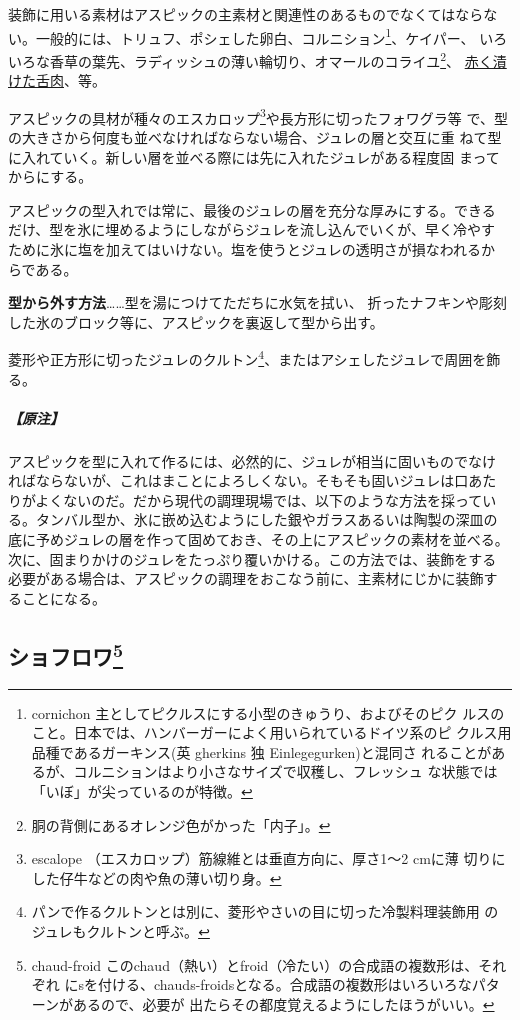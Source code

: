 装飾に用いる素材はアスピックの主素材と関連性のあるものでなくてはならな
い。一般的には、トリュフ、ポシェした卵白、コルニション\footnote{cornichon
  主としてピクルスにする小型のきゅうり、およびそのピク
  ルスのこと。日本では、ハンバーガーによく用いられているドイツ系のピ
  クルス用品種であるガーキンス(英 gherkins 独 Einlegegurken)と混同さ
  れることがあるが、コルニションはより小さなサイズで収穫し、フレッシュ
  な状態では「いぼ」が尖っているのが特徴。}、ケイパー、
いろいろな香草の葉先、ラディッシュの薄い輪切り、オマールのコライユ\footnote{胴の背側にあるオレンジ色がかった「内子」。}、
\protect\hyperlink{saumure-liquide-pour-langues}{赤く漬けた舌肉}、等。

アスピックの具材が種々のエスカロップ\footnote{escalope
  （エスカロップ）筋線維とは垂直方向に、厚さ1〜2 cmに薄
  切りにした仔牛などの肉や魚の薄い切り身。}や長方形に切ったフォワグラ等
で、型の大きさから何度も並べなければならない場合、ジュレの層と交互に重
ねて型に入れていく。新しい層を並べる際には先に入れたジュレがある程度固
まってからにする。

アスピックの型入れでは常に、最後のジュレの層を充分な厚みにする。できる
だけ、型を氷に埋めるようにしながらジュレを流し込んでいくが、早く冷やす
ために氷に塩を加えてはいけない。塩を使うとジュレの透明さが損なわれるか
らである。

\noindent\textbf{型から外す方法}\ldots{}\ldots{}型を湯につけてただちに水気を拭い、
折ったナフキンや彫刻した氷のブロック等に、アスピックを裏返して型から出す。

菱形や正方形に切ったジュレのクルトン\footnote{パンで作るクルトンとは別に、菱形やさいの目に切った冷製料理装飾用
  のジュレもクルトンと呼ぶ。}、またはアシェしたジュレで周囲を飾 る。

\hypertarget{nota-aspics}{%
\subparagraph{【原注】}\label{nota-aspics}}

アスピックを型に入れて作るには、必然的に、ジュレが相当に固いものでなけ
ればならないが、これはまことによろしくない。そもそも固いジュレは口あた
りがよくないのだ。だから現代の調理現場では、以下のような方法を採ってい
る。タンバル型か、氷に嵌め込むようにした銀やガラスあるいは陶製の深皿の
底に予めジュレの層を作って固めておき、その上にアスピックの素材を並べる。
次に、固まりかけのジュレをたっぷり覆いかける。この方法では、装飾をする
必要がある場合は、アスピックの調理をおこなう前に、主素材にじかに装飾す
ることになる。

\hypertarget{chauds-froids}{%
\subsection[ショフロワ]{\texorpdfstring{ショフロワ\footnote{chaud-froid
  このchaud（熱い）とfroid（冷たい）の合成語の複数形は、それぞれ
  にsを付ける、chauds-froidsとなる。合成語の複数形はいろいろなパターンがあるので、必要が
  出たらその都度覚えるようにしたほうがいい。}}{ショフロワ}}\label{chauds-froids}}

